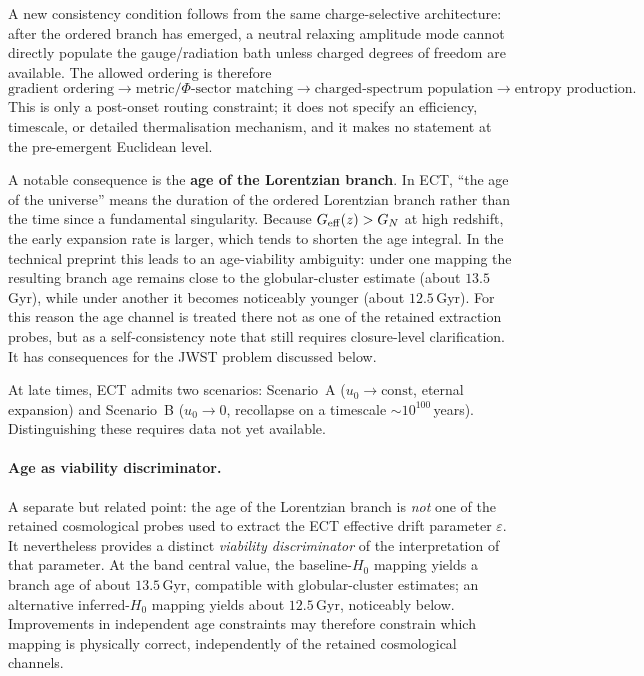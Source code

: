 \documentclass[11pt,a4paper]{article}
\begin{document}
A new consistency condition follows from the same charge-selective architecture: after the ordered branch has emerged, a neutral relaxing amplitude mode cannot directly populate the gauge/radiation bath unless charged degrees of freedom are available. The allowed ordering is therefore
\[
\text{gradient ordering}
\to
\text{metric/\(\Phi\)-sector matching}
\to
\text{charged-spectrum population}
\to
\text{entropy production}.
\]
This is only a post-onset routing constraint; it does not specify an efficiency, timescale, or detailed thermalisation mechanism, and it makes no statement at the pre-emergent Euclidean level.

A notable consequence is the \textbf{age of the Lorentzian branch}. In ECT, ``the age of the universe'' means the duration of the ordered Lorentzian branch rather than the time since a fundamental singularity. Because $G_{\rm eff}(z) > G_N$ at high redshift, the early expansion rate is larger, which tends to shorten the age integral. In the technical preprint this leads to an age-viability ambiguity: under one mapping the resulting branch age remains close to the globular-cluster estimate (about $13.5$\,Gyr), while under another it becomes noticeably younger (about $12.5$\,Gyr). For this reason the age channel is treated there not as one of the retained extraction probes, but as a self-consistency note that still requires closure-level clarification. It has consequences for the JWST problem discussed below.

At late times, ECT admits two scenarios: Scenario~A ($u_0 \to \text{const}$, eternal expansion) and Scenario~B ($u_0 \to 0$, recollapse on a timescale $\sim 10^{100}$\,years). Distinguishing these requires data not yet available.

\paragraph{Age as viability discriminator.}
A separate but related point: the age of the Lorentzian branch is \emph{not} one of the retained cosmological probes used to extract the ECT effective drift parameter $\varepsilon$. It nevertheless provides a distinct \emph{viability discriminator} of the interpretation of that parameter. At the band central value, the baseline-$H_0$ mapping yields a branch age of about $13.5$\,Gyr, compatible with globular-cluster estimates; an alternative inferred-$H_0$ mapping yields about $12.5$\,Gyr, noticeably below. Improvements in independent age constraints may therefore constrain which mapping is physically correct, independently of the retained cosmological channels.
\end{document}
